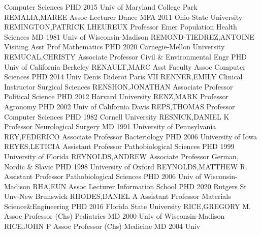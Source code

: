 \documentclass[
]{article}
\begin{document}
\textbar Computer Sciences \textbar PHD 2015 Univ of Maryland College
Park \textbar{}  \textbar REMALIA,MAREE \textbar Assoc
Lecturer \textbar Dance \textbar MFA 2011 Ohio State University
\textbar{}  \textbar REMINGTON,PATRICK LHEUREUX
\textbar Professor Emer \textbar Population Health Sciences \textbar MD
1981 Univ of Wisconsin-Madison \textbar{} 
\textbar REMOND-TIEDREZ,ANTOINE \textbar Visiting Asst Prof
\textbar Mathematics \textbar PHD 2020 Carnegie-Mellon University
\textbar{}  \textbar REMUCAL,CHRISTY \textbar Associate
Professor \textbar Civil \& Environmental Engr \textbar PHD Univ of
California Berkeley \textbar{}  \textbar RENAULT,MARC
\textbar Asst Faculty Assoc \textbar Computer Sciences \textbar PHD 2014
Univ Denis Diderot Paris VII \textbar{} 
\textbar RENNER,EMILY \textbar Clinical Instructor \textbar Surgical
Sciences \textbar RENSHON,JONATHAN \textbar{} 
\textbar Associate Professor \textbar Political Science \textbar PHD
2012 Harvard University \textbar RENZ,MARK \textbar{} 
\textbar Professor \textbar Agronomy \textbar PHD 2002 Univ of
California Davis \textbar REPS,THOMAS \textbar{} 
\textbar Professor \textbar Computer Sciences \textbar PHD 1982 Cornell
University \textbar RESNICK,DANIEL K \textbar{} 
\textbar Professor \textbar Neurological Surgery \textbar MD 1991
University of Pennsylvania \textbar REY,FEDERICO \textbar{} 
\textbar Associate Professor \textbar Bacteriology \textbar PHD 2006
University of Iowa \textbar REYES,LETICIA \textbar{} 
\textbar Assistant Professor \textbar Pathobiological Sciences
\textbar PHD 1999 University of Florida \textbar REYNOLDS,ANDREW
\textbar{}  \textbar Associate Professor \textbar German,
Nordic \& Slavic \textbar PHD 1998 University of Oxford
\textbar REYNOLDS,MATTHEW R. \textbar{}  \textbar Assistant
Professor \textbar Pathobiological Sciences \textbar PHD 2006 Univ of
Wisconsin-Madison \textbar RHA,EUN \textbar{} 
\textbar Assoc Lecturer \textbar Information School \textbar PHD 2020
Rutgers St Unv-New Brunswick \textbar RHODES,DANIEL A \textbar{}
 \textbar Assistant Professor \textbar Materials
Science\&Engineering \textbar PHD 2016 Florida State University
\textbar RICE,GREGORY M. \textbar{}  \textbar Assoc
Professor (Chs) \textbar Pediatrics \textbar MD 2000 Univ of
Wisconsin-Madison \textbar RICE,JOHN P \textbar{} 
\textbar Assoc Professor (Chs) \textbar Medicine \textbar MD 2004 Univ
\end{document}
